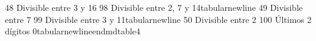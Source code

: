 {}48 \markdownRendererAmpersand{} Divisible entre 3 y 16 \markdownRendererAmpersand{} 98 \markdownRendererAmpersand{} Divisible entre 2, 7 y 14\markdownRendererBackslash{}tabularnewline\markdownRendererSoftLineBreak
{}49 \markdownRendererAmpersand{} Divisible entre 7 \markdownRendererAmpersand{} 99 \markdownRendererAmpersand{} Divisible entre 3 y 11\markdownRendererBackslash{}tabularnewline\markdownRendererSoftLineBreak
{}50 \markdownRendererAmpersand{} Divisible entre 2 \markdownRendererAmpersand{} 100 \markdownRendererAmpersand{} Últimos 2 dígitos 0\markdownRendererBackslash{}tabularnewline\markdownRendererBackslash{}end\markdownRendererLeftBrace{}mdtable4\markdownRendererRightBrace{}
\markdownRendererSectionEnd 
\markdownRendererSectionEnd 
\markdownRendererSectionEnd \markdownRendererDocumentEnd